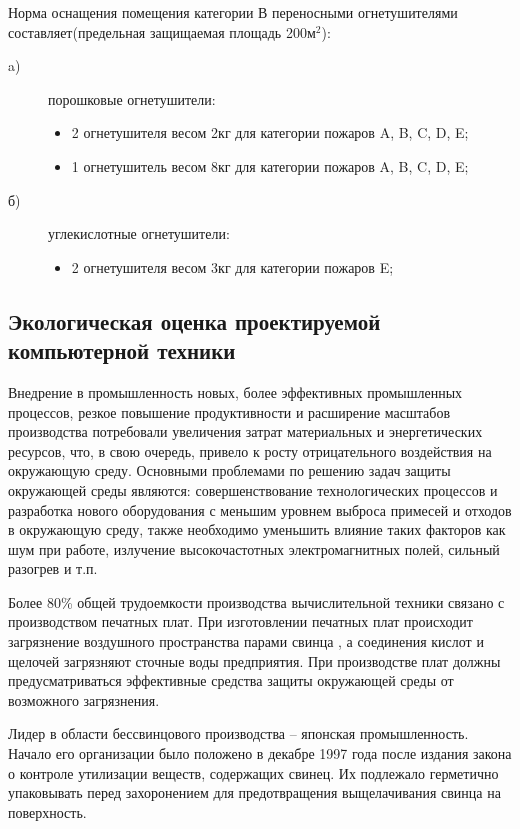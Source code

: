 Норма оснащения помещения категории В переносными огнетушителями составляет(предельная защищаемая площадь 200м$^2$): 
\begin{description}

	\item[a)] порошковые огнетушители:
		\begin{itemize}
		\item 2 огнетушителя весом 2кг для категории пожаров A, B, C, D, E;
		\item 1 огнетушитель весом 8кг для категории пожаров A, B, C, D, E;
		\end{itemize}
	\item[б)] 	углекислотные огнетушители:
		\begin{itemize}
		\item 2 огнетушителя весом 3кг для категории пожаров E;
		\end{itemize}

\end{description}

\subsection{Экологическая оценка проектируемой компьютерной техники}
Внедрение в промышленность новых, более эффективных промышленных процессов, резкое повышение продуктивности и расширение
масштабов производства потребовали увеличения затрат материальных и энергетических ресурсов, что, в свою очередь,
привело к росту отрицательного воздействия на окружающую среду. Основными проблемами по решению задач защиты окружающей
среды являются: совершенствование технологических процессов и разработка нового оборудования с меньшим уровнем выброса
примесей и отходов в окружающую среду, также необходимо уменьшить влияние таких факторов как шум при работе, излучение
высокочастотных электромагнитных полей, сильный разогрев и т.п.

Более 80\% общей трудоемкости производства вычислительной техники связано с производством печатных плат.
При изготовлении печатных плат происходит загрязнение воздушного пространства парами свинца \cite{bjd43}, а соединения кислот и
щелочей загрязняют сточные воды предприятия. При производстве плат должны предусматриваться эффективные средства
защиты окружающей среды от возможного загрязнения.

Лидер в области бессвинцового производства – японская промышленность. Начало его организации было положено в декабре 1997 года
после издания закона о контроле утилизации веществ, содержащих свинец. Их подлежало герметично упаковывать перед захоронением
для предотвращения выщелачивания свинца на поверхность.

